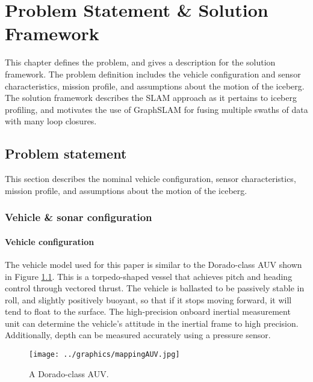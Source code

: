 
\chapter{Problem Statement \& Solution Framework}
\label{ch.ProblemStatement}

This chapter defines the problem, and gives a description for the solution framework. The problem definition includes the vehicle configuration and sensor characteristics, mission profile, and assumptions about the motion of the iceberg. The solution framework describes the SLAM approach as it pertains to iceberg profiling, and motivates the use of GraphSLAM for fusing multiple swaths of data with many loop closures. 

\section{Problem statement}

This section describes the nominal vehicle configuration, sensor characteristics, mission profile,  and assumptions about the motion of the iceberg. 

\subsection{Vehicle \& sonar configuration}
\label{sec.VehicleSetup}

\subsubsection{Vehicle configuration}
The vehicle model used for this paper is similar to the Dorado-class AUV shown in Figure \ref{fig:AUVdorado}. This is a torpedo-shaped vessel that achieves pitch and heading control through vectored thrust. The vehicle is ballasted to be passively stable in roll, and slightly positively buoyant, so that if it stops moving forward, it will tend to float to the surface. The high-precision onboard inertial measurement unit can determine the vehicle's attitude in the inertial frame to high precision. Additionally, depth can be measured accurately using a pressure sensor. 

\begin{figure}[htb]
   \centering
   \texttt{[image: ../graphics/mappingAUV.jpg]} %
   \caption{A Dorado-class AUV.}
   \label{fig:AUVdorado}
\end{figure}



